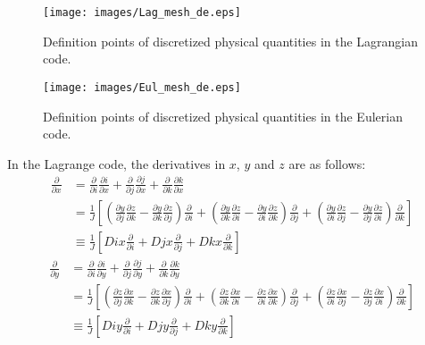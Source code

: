 \begin{figure}[H]
	\centering
	\texttt{[image: images/Lag\_mesh\_de.eps]}
	\caption{Definition points of discretized physical quantities in the Lagrangian code.}\label{definition_La}
	\end{figure}
	
\begin{figure}[H]
	\centering
	\texttt{[image: images/Eul\_mesh\_de.eps]}
	\caption{Definition points of discretized physical quantities in the Eulerian code.}\label{definition_Eu}
	\end{figure}

In the Lagrange code, the derivatives in $ x $, $ y $ and $ z $ are as follows:
\begin{equation}
\begin{split}
\frac{\partial }{\partial x}
&=\frac{\partial}{\partial i}\frac{\partial i}{\partial x}+\frac{\partial}{\partial j}\frac{\partial j}{\partial x}+\frac{\partial}{\partial k}\frac{\partial k}{\partial x}\\
&=\frac{1}{J}\left[(\frac{\partial y}{\partial j}\frac{\partial z}{\partial k}-\frac{\partial y}{\partial k}\frac{\partial z}{\partial j})\frac{\partial}{\partial i}+(\frac{\partial y}{\partial k}\frac{\partial z}{\partial i}-\frac{\partial y}{\partial i}\frac{\partial z}{\partial k})\frac{\partial}{\partial j}+(\frac{\partial y}{\partial i}\frac{\partial z}{\partial j}-\frac{\partial y}{\partial j}\frac{\partial z}{\partial i})\frac{\partial}{\partial k}\right]\\
& \equiv \frac{1}{J}\left[Dix\frac{\partial}{\partial i}+Djx\frac{\partial}{\partial j}+Dkx\frac{\partial}{\partial k}\right]
\end{split}
\end{equation}
\begin{equation}
\begin{split}
\frac{\partial }{\partial y}&
=\frac{\partial}{\partial i}\frac{\partial i}{\partial y}+\frac{\partial}{\partial j}\frac{\partial j}{\partial y}+\frac{\partial}{\partial k}\frac{\partial k}{\partial y}\\
&=\frac{1}{J}\left[(\frac{\partial z}{\partial j}\frac{\partial x}{\partial k}-\frac{\partial z}{\partial k}\frac{\partial x}{\partial j})\frac{\partial}{\partial i}+(\frac{\partial z}{\partial k}\frac{\partial x}{\partial i}-\frac{\partial z}{\partial i}\frac{\partial x}{\partial k})\frac{\partial}{\partial j}+(\frac{\partial z}{\partial i}\frac{\partial x}{\partial j}-\frac{\partial z}{\partial j}\frac{\partial x}{\partial i})\frac{\partial}{\partial k}\right]\\
& \equiv \frac{1}{J}\left[Diy\frac{\partial}{\partial i}+Djy\frac{\partial}{\partial j}+Dky\frac{\partial}{\partial k}\right]
\end{split}
\end{equation}
